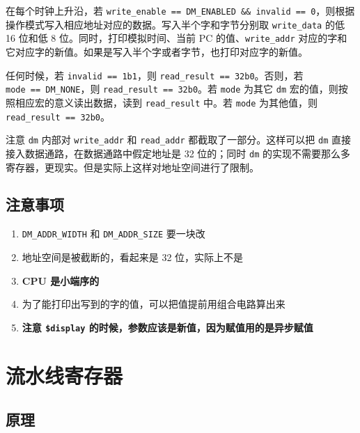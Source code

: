 \documentclass[12pt,AutoFakeBold,AutoFakeSlant]{article}
\providecommand{\tightlist}{%
  \setlength{\itemsep}{0pt}\setlength{\parskip}{0pt}}
\begin{document}
在每个时钟上升沿，若
\texttt{write\_enable\ ==\ DM\_ENABLED\ \&\&\ invalid\ ==\ 0}，则根据操作模式写入相应地址对应的数据。写入半个字和字节分别取
\texttt{write\_data} 的低 16 位和低 8 位。同时，打印模拟时间、当前 PC
的值、\texttt{write\_addr}
对应的字和它对应字的新值。如果是写入半个字或者字节，也打印对应字的新值。

任何时候，若 \texttt{invalid\ ==\ 1\textquotesingle{}b1}，则
\texttt{read\_result\ ==\ 32\textquotesingle{}b0}。否则，若 \texttt{mode\ ==\ DM\_NONE}，则
\texttt{read\_result\ ==\ 32\textquotesingle{}b0}。若 \texttt{mode}
为其它 \texttt{dm} 宏的值，则按照相应宏的意义读出数据，读到
\texttt{read\_result} 中。若 \texttt{mode} 为其他值，则
\texttt{read\_result\ ==\ 32\textquotesingle{}b0}。

注意 \texttt{dm} 内部对 \texttt{write\_addr} 和 \texttt{read\_addr}
都截取了一部分。这样可以把 \texttt{dm}
直接接入数据通路，在数据通路中假定地址是 32 位的；同时 \texttt{dm}
的实现不需要那么多寄存器，更现实。但是实际上这样对地址空间进行了限制。

\hypertarget{ux6ce8ux610fux4e8bux9879-5}{%
\subsection{注意事项}\label{ux6ce8ux610fux4e8bux9879-5}}

\begin{enumerate}
\def\labelenumi{\arabic{enumi}.}
\tightlist
\item
  \texttt{DM\_ADDR\_WIDTH} 和 \texttt{DM\_ADDR\_SIZE} 要一块改
\item
  地址空间是被截断的，看起来是 32 位，实际上不是
\item
  \textbf{CPU 是小端序的}
\item
  为了能打印出写到的字的值，可以把值提前用组合电路算出来
\item \textbf{注意 \texttt{\$display} 的时候，参数应该是新值，因为赋值用的是异步赋值}
\end{enumerate}

\hypertarget{ux6d41ux6c34ux7ebfux5bc4ux5b58ux5668}{%
\section{流水线寄存器}\label{ux6d41ux6c34ux7ebfux5bc4ux5b58ux5668}}

\hypertarget{ux539fux7406-8}{%
\subsection{原理}\label{ux539fux7406-8}}
\end{document}
